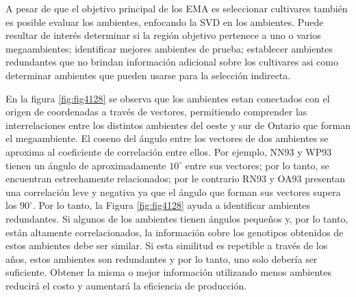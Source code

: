 

A pesar de que el objetivo principal de los EMA es seleccionar cultivares también es posible evaluar los ambientes,  enfocando la SVD en los ambientes. Puede resultar de interés determinar si la región objetivo pertenece a uno o varios megaambientes; identificar mejores ambientes de prueba; establecer ambientes redundantes que no brindan información adicional sobre los cultivares asi como determinar ambientes que pueden usarse para la selección indirecta.

En la figura \ref{fig:fig4128} se observa que los ambientes estan conectados con el origen de coordenadas a través de vectores, permitiendo comprender las interrelaciones entre los distintos ambientes del oeste y sur de Ontario que forman el megaambiente. El coseno del ángulo entre los vectores de dos ambientes se aproxima al coeficiente de correlación entre ellos. Por ejemplo, NN93 y WP93 tienen un ángulo de aproximadamente $10^{\circ}$ entre sus vectores; por lo tanto, se encuentran estrechamente relacionados; por le contrario RN93 y OA93 presentan una correlación leve y negativa ya que el ángulo que forman sus vectores supera los $90^{\circ}$.  Por lo tanto, la Figura \ref{fig:fig4128} ayuda a identificar ambientes redundantes. Si algunos de los ambientes tienen ángulos pequeños y, por lo tanto, están altamente correlacionados, la información sobre los genotipos obtenidos de estos ambientes debe ser similar. Si esta similitud es repetible a través de los años, estos ambientes son redundantes y por lo tanto, uno solo debería ser suficiente. Obtener la misma o mejor información utilizando menos ambientes reducirá el costo y aumentará la eficiencia de producción.

